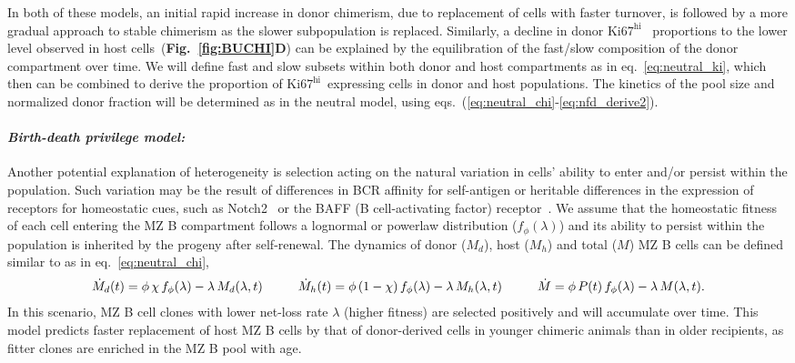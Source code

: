 \documentclass[11pt]{article}
\newcommand{\khi}{\ensuremath{\text{Ki67}^\text{hi}}~}
\newcommand{\para}[1]{\vspace*{-4.5mm}\paragraph{#1}}
\begin{document}
In both of these models, an initial rapid increase in donor chimerism, due to replacement of cells with faster turnover, is followed by a more gradual approach to stable chimerism as the slower subpopulation is replaced.
Similarly, a decline in donor {\khi} proportions to the lower level observed in host cells~(\textbf{Fig.~\ref{fig:BUCHI}D}) can be explained by the equilibration of the fast/slow composition of the donor compartment over time.
We will define fast and slow subsets within both donor and host compartments as in eq.~\ref{eq:neutral_ki}, which then can be combined to derive the proportion of \khi expressing cells in donor and host populations.
The kinetics of the pool size and normalized donor fraction will be determined as in the neutral model, using eqs.~(\ref{eq:neutral_chi}-\ref{eq:nfd_derive2}).


\para{\textit{Birth-death privilege model:}}
Another potential explanation of heterogeneity is selection acting on the natural variation in cells' ability to enter and/or persist within the population.  
Such variation may be the result of differences in BCR affinity for self-antigen or heritable differences in the expression of receptors for homeostatic cues, such as Notch2~\cite{Witt_2003, Saito_2003} or the BAFF (B cell-activating factor) receptor~\cite{Thien_2004, Thompson_2001}.
We assume that the homeostatic fitness of each cell entering the MZ B compartment follows a lognormal or powerlaw distribution ($f_{\phi}(\lambda)$) and its ability to persist within the population is inherited by the progeny after self-renewal. 
The dynamics of donor ($M_{d}$), host ($M_{h}$) and total ($M$) MZ B cells can be defined similar to as in eq.~\ref{eq:neutral_chi},
\begin{equation} \small
\dot M_{d}(t) = \phi \, \chi \, f_{\phi}(\lambda) - \lambda \, M_{d}(\lambda, t) \quad \quad \quad
\dot M_{h}(t) = \phi \, (1-\chi) \, f_{\phi}(\lambda) - \lambda \, M_{h}(\lambda, t) \quad \quad \quad
\dot{M} = \phi \,P(t) \, f_{\phi}(\lambda) - \lambda \, M(\lambda, t).
\end{equation}
In this scenario, MZ B cell clones with lower net-loss rate $\lambda$ (higher fitness) are selected positively and will accumulate over time.
This model predicts faster replacement of host MZ B cells by that of donor-derived cells in younger chimeric animals than in older recipients, as fitter clones are enriched in the MZ B pool with age.
\end{document}
